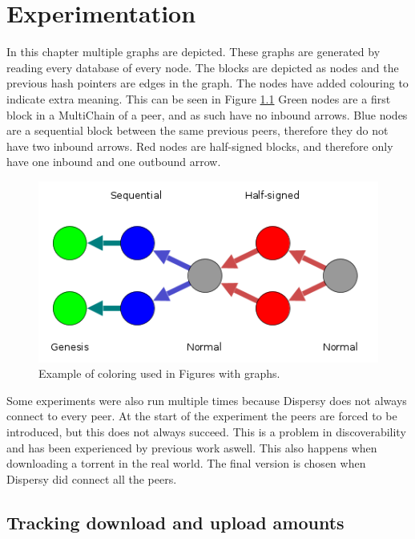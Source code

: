 \chapter{Experimentation}

In this chapter multiple graphs are depicted.
These graphs are generated by reading every database of every node.
The blocks are depicted as nodes and the previous hash pointers are edges in the graph.
The nodes have added colouring to indicate extra meaning.
This can be seen in Figure \ref{fig:graph-example}
Green nodes are a first block in a MultiChain of a peer,
and as such have no inbound arrows.
Blue nodes are a sequential block between the same previous peers,
therefore they do not have two inbound arrows.
Red nodes are half-signed blocks,
and therefore only have one inbound and one outbound arrow.

\begin{figure}[!h]
	\centerline{\includegraphics[scale=0.6]{experimentation/example.png}}
	\caption{Example of coloring used in Figures with graphs.}
	\label{fig:graph-example}
\end{figure}

Some experiments were also run multiple times because Dispersy does not always connect to every peer.
At the start of the experiment the peers are forced to be introduced,
but this does not always succeed.
This is a problem in discoverability and has been experienced by previous work aswell\cite{ruigrok-anonymous}.
This also happens when downloading a torrent in the real world.
The final version is chosen when Dispersy did connect all the peers.



\section{Tracking download and upload amounts}







